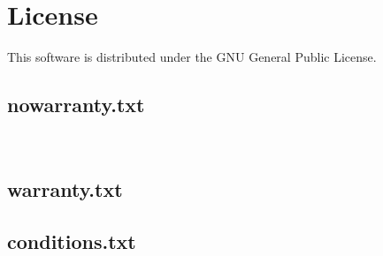 \section{License}\label{sec:license}

This software is distributed under the  GNU General Public License.

\subsection{nowarranty.txt}\label{sec:nowar}
{\scriptsize \ME~

}

\subsection{warranty.txt}\label{sec:war}
{\scriptsize

}

\subsection{conditions.txt}\label{sec:cond}
{\scriptsize

}



